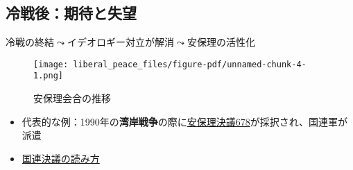 \documentclass[
  xelatex,
  ja=standard]{bxjsarticle}
\providecommand{\tightlist}{%
  \setlength{\itemsep}{0pt}\setlength{\parskip}{0pt}}\usepackage{longtable,booktabs,array}
\begin{document}
\hypertarget{ux51b7ux6226ux5f8cux671fux5f85ux3068ux5931ux671b}{%
\subsection{冷戦後：期待と失望}\label{ux51b7ux6226ux5f8cux671fux5f85ux3068ux5931ux671b}}

冷戦の終結\(\leadsto\)イデオロギー対立が解消\(\leadsto\)安保理の活性化

\begin{figure}[htpb]

{\centering \texttt{[image: liberal\_peace\_files/figure-pdf/unnamed-chunk-4-1.png]}

}

\caption{安保理会合の推移}

\end{figure}

\begin{itemize}
\tightlist
\item
  代表的な例：1990年の\textbf{湾岸戦争}の際に\href{https://digitallibrary.un.org/record/102245}{安保理決議678}が採択され、国連軍が派遣
\item
  \href{https://research.un.org/en/docs/resolutions}{国連決議の読み方}
\end{itemize}
\end{document}
